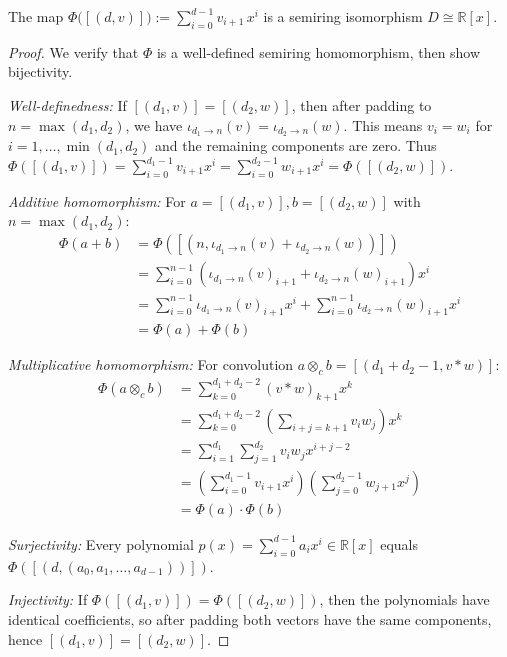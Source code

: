 \begin{theorem}\label{thm:polyIso}
The map \(\Phi\bigl([(d,v)]\bigr):=\sum_{i=0}^{d-1} v_{i+1}\,x^{i}\) is a semiring isomorphism \(D\cong\mathbb R[x]\).
\end{theorem}
\begin{proof}
We verify that $\Phi$ is a well-defined semiring homomorphism, then show bijectivity.

\textit{Well-definedness:}
If $[(d_1,v)] = [(d_2,w)]$, then after padding to $n = \max(d_1,d_2)$, we have $\iota_{d_1 \to n}(v) = \iota_{d_2 \to n}(w)$. This means $v_i = w_i$ for $i = 1,\ldots,\min(d_1,d_2)$ and the remaining components are zero. Thus $\Phi([(d_1,v)]) = \sum_{i=0}^{d_1-1} v_{i+1} x^i = \sum_{i=0}^{d_2-1} w_{i+1} x^i = \Phi([(d_2,w)])$.

\textit{Additive homomorphism:}
For $a = [(d_1,v)], b = [(d_2,w)]$ with $n = \max(d_1,d_2)$:
\begin{align}
\Phi(a + b) &= \Phi([(n, \iota_{d_1 \to n}(v) + \iota_{d_2 \to n}(w))]) \\
&= \sum_{i=0}^{n-1} (\iota_{d_1 \to n}(v)_{i+1} + \iota_{d_2 \to n}(w)_{i+1}) x^i \\
&= \sum_{i=0}^{n-1} \iota_{d_1 \to n}(v)_{i+1} x^i + \sum_{i=0}^{n-1} \iota_{d_2 \to n}(w)_{i+1} x^i \\
&= \Phi(a) + \Phi(b)
\end{align}

\textit{Multiplicative homomorphism:}
For convolution $a \otimes_c b = [(d_1+d_2-1, v \ast w)] $:
\begin{align}
\Phi(a \otimes_c b) &= \sum_{k=0}^{d_1+d_2-2} (v \ast w)_{k+1} x^k \\
&= \sum_{k=0}^{d_1+d_2-2} \left(\sum_{i+j=k+1} v_i w_j\right) x^k \\
&= \sum_{i=1}^{d_1} \sum_{j=1}^{d_2} v_i w_j x^{i+j-2} \\
&= \left(\sum_{i=0}^{d_1-1} v_{i+1} x^i\right)\left(\sum_{j=0}^{d_2-1} w_{j+1} x^j\right) \\
&= \Phi(a) \cdot \Phi(b)
\end{align}

\textit{Surjectivity:}
Every polynomial $p(x) = \sum_{i=0}^{d-1} a_i x^i \in \mathbb{R}[x]$ equals $\Phi([(d, (a_0, a_1, \ldots, a_{d-1}))])$.

\textit{Injectivity:}
If $\Phi([(d_1,v)]) = \Phi([(d_2,w)])$, then the polynomials have identical coefficients, so after padding both vectors have the same components, hence $[(d_1,v)] = [(d_2,w)]$.
\end{proof}

